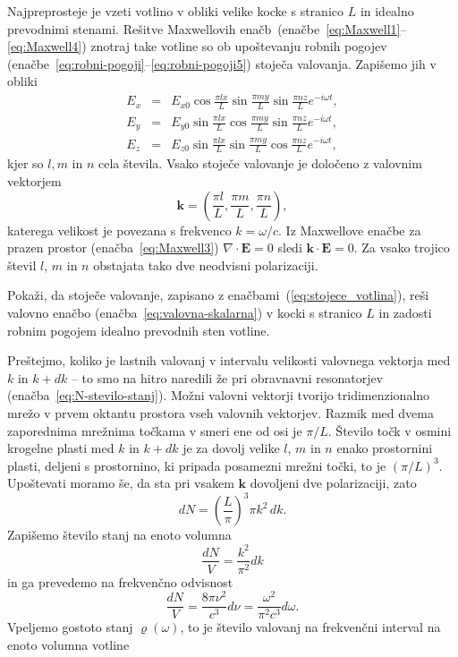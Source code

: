 Najpreprosteje je vzeti votlino v obliki velike kocke s stranico
$L$ in idealno prevodnimi stenami. Rešitve Maxwellovih enačb~(enačbe~\ref{eq:Maxwell1}--\ref{eq:Maxwell4}) 
znotraj take votline so ob upoštevanju robnih pogojev 
(enačbe~\ref{eq:robni-pogoji}--\ref{eq:robni-pogoji5}) 
stoječa valovanja. Zapišemo jih v obliki
\begin{eqnarray}
E_{x} & = & E_{x0}\cos\frac{\pi lx}{L}\sin\frac{\pi my}{L}\sin\frac{\pi nz}{L}e^{-i\omega t},\nonumber \\
E_{y} & = & E_{y0}\sin\frac{\pi lx}{L}\cos\frac{\pi my}{L}\sin\frac{\pi nz}{L}e^{-i\omega t},\nonumber \\
E_{z} & = & E_{z0}\sin\frac{\pi lx}{L}\sin\frac{\pi my}{L}\cos\frac{\pi nz}{L}e^{-i\omega t},
\label{eq:stojece_votlina}
\end{eqnarray}
kjer so $l,m$ in $n$ cela števila. Vsako stoječe valovanje je določeno z valovnim 
vektorjem
\begin{equation}
\mathbf{k}=\left(\frac{\pi l}{L},\frac{\pi m}{L},\frac{\pi n}{L}\right),
\end{equation} 
katerega velikost je povezana s frekvenco $k = \omega/c$.
Iz Maxwellove enačbe za prazen prostor (enačba~\ref{eq:Maxwell3}) 
$\nabla\cdot\mathbf{E}=0$ sledi $\mathbf{k}\cdot\mathbf{E}=0$. 
Za vsako trojico števil $l$, $m$ in $n$ obstajata tako dve
neodvisni polarizaciji.

\begin{definition}
 Pokaži, da stoječe valovanje, zapisano z enačbami~(\ref{eq:stojece_votlina}), reši 
 valovno enačbo (enačba~\ref{eq:valovna-skalarna}) v 
 kocki s stranico $L$ in zadosti robnim pogojem idealno prevodnih sten votline.
\end{definition}

Preštejmo, koliko je lastnih valovanj v intervalu velikosti valovnega
vektorja med $k$ in $k+dk$ -- to smo na hitro naredili že pri obravnavni
resonatorjev (enačba~\ref{eq:N-stevilo-stanj}). Možni valovni vektorji tvorijo tridimenzionalno
mrežo v prvem oktantu prostora vseh valovnih vektorjev. Razmik med
dvema zaporednima mrežnima točkama v smeri ene od osi je $\pi/L$.
Število točk v osmini krogelne plasti med $k$ in $k+dk$ je za dovolj
velike $l$, $m$ in $n$ enako prostornini plasti, deljeni
s prostornino, ki pripada posamezni mrežni točki, to je $(\pi/L)^{3}$.
Upoštevati moramo še, da sta pri vsakem $\mathbf{k}$ dovoljeni dve polarizaciji, zato
\begin{equation}
dN=\left(\frac{L}{\pi}\right)^{3}\pi k^{2}\, dk.
\label{4.2}
\end{equation}
Zapišemo število stanj na enoto volumna
\begin{equation}
\frac{dN}{V}=\frac{ k^{2}}{\pi^{2}} dk
\label{4.3}
\end{equation}
in ga prevedemo na frekvenčno odvisnost
\begin{equation}
\frac{dN}{V}=\frac{8 \pi \nu^{2} }{c^{3}}d\nu = \frac{\omega^2}{\pi^2c^3}d\omega.
\end{equation}
Vpeljemo gostoto stanj  $\varrho (\omega)$, to je število valovanj na frekvenčni interval na enoto volumna 
votline

